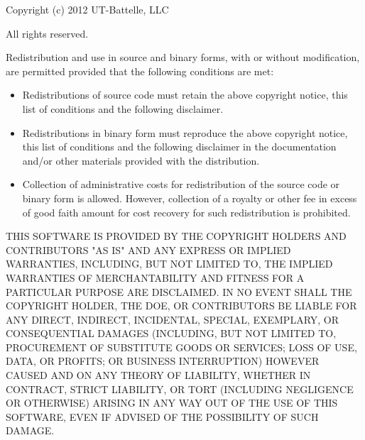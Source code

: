 \documentclass[11pt]{amsart}
\begin{document}
Copyright (c) 2012 UT-Battelle, LLC

All rights reserved.


Redistribution and use in source and binary forms, with or without modification, are permitted provided that the following conditions are met:
\begin{itemize}
\item Redistributions of source code must retain the above copyright notice, this list of conditions and the following disclaimer.
\item Redistributions in binary form must reproduce the above copyright notice, this list of conditions and the following disclaimer in the documentation and/or other materials provided with the distribution.
\item Collection of administrative costs for redistribution of the source code or binary form is allowed. However, collection of a royalty or other fee in excess of good faith amount for cost recovery for such redistribution is prohibited.




\end{itemize}

THIS SOFTWARE IS PROVIDED BY THE COPYRIGHT HOLDERS AND CONTRIBUTORS "AS IS" AND ANY EXPRESS OR IMPLIED WARRANTIES, INCLUDING, BUT NOT LIMITED TO, THE IMPLIED WARRANTIES OF MERCHANTABILITY AND FITNESS FOR A PARTICULAR PURPOSE ARE DISCLAIMED. 
IN NO EVENT SHALL THE COPYRIGHT HOLDER, THE DOE, OR CONTRIBUTORS BE LIABLE FOR ANY DIRECT, INDIRECT, INCIDENTAL, SPECIAL, EXEMPLARY, OR CONSEQUENTIAL DAMAGES (INCLUDING, BUT NOT LIMITED TO, PROCUREMENT OF SUBSTITUTE GOODS OR SERVICES; LOSS OF USE, DATA, OR PROFITS; OR BUSINESS INTERRUPTION) HOWEVER CAUSED AND ON ANY THEORY OF LIABILITY, WHETHER IN CONTRACT, STRICT LIABILITY, OR TORT (INCLUDING NEGLIGENCE OR OTHERWISE) ARISING IN ANY WAY OUT OF THE USE OF THIS SOFTWARE, EVEN IF ADVISED OF THE POSSIBILITY OF SUCH DAMAGE.
\end{document}
